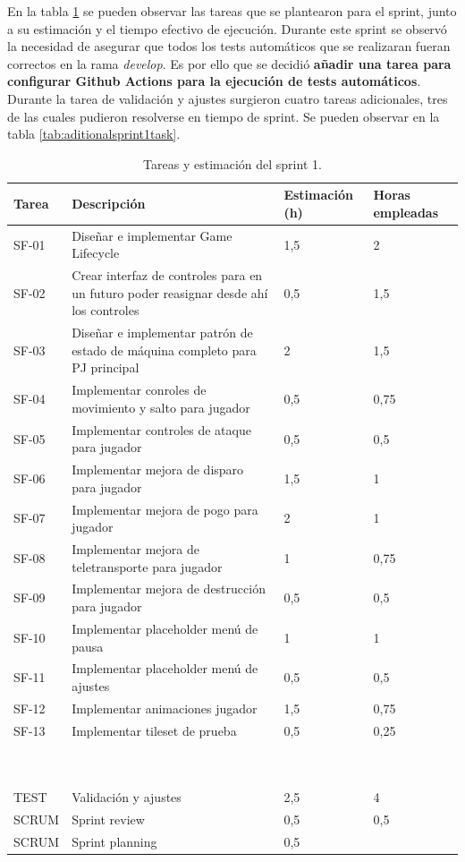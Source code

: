 En la tabla \ref{tab:sprint1task} se pueden observar las tareas que se plantearon para el sprint, junto a su estimación y el tiempo efectivo de ejecución. Durante este sprint se observó la necesidad de asegurar que todos los tests automáticos que se realizaran fueran correctos en la rama \textit{develop}. Es por ello que se decidió \textbf{añadir una tarea para configurar Github Actions para la ejecución de tests automáticos}. Durante la tarea de validación y ajustes surgieron cuatro tareas adicionales, tres de las cuales pudieron resolverse en tiempo de sprint. Se pueden observar en la tabla \ref{tab:aditionalsprint1task}.

\begin{table}[!ht]
    \centering
    \begin{tabular}{|l|p{8cm}|p{2cm}|p{2cm}|}
    \hline
        Tarea & Descripción & Estimación (h) & Horas empleadas \\ \hline
        SF-01 & Diseñar e implementar Game Lifecycle & 1,5 & 2 \\ \hline
        SF-02 & Crear interfaz de controles para en un futuro poder reasignar desde ahí los controles & 0,5 & 1,5 \\ \hline
        SF-03 & Diseñar e implementar patrón de estado de máquina completo para PJ principal & 2 & 1,5 \\ \hline
        SF-04 & Implementar conroles de movimiento y salto para jugador & 0,5 & 0,75 \\ \hline
        SF-05 & Implementar controles de ataque para jugador & 0,5 & 0,5 \\ \hline
        SF-06 & Implementar mejora de disparo para jugador & 1,5 & 1 \\ \hline
        SF-07 & Implementar mejora de pogo para jugador & 2 & 1 \\ \hline
        SF-08 & Implementar mejora de teletransporte para jugador & 1 & 0,75 \\ \hline
        SF-09 & Implementar mejora de destrucción para jugador & 0,5 & 0,5 \\ \hline
        SF-10 & Implementar placeholder menú de pausa & 1 & 1 \\ \hline
        SF-11 & Implementar placeholder menú de ajustes & 0,5 & 0,5 \\ \hline
        SF-12 & Implementar animaciones jugador & 1,5 & 0,75 \\ \hline
        SF-13 & Implementar tileset de prueba & 0,5 & 0,25 \\ \hline
        ~ & ~ & ~ & ~ \\ \hline
        ~ & ~ & ~ & ~ \\ \hline
        TEST & Validación y ajustes & 2,5 & 4 \\ \hline
        SCRUM & Sprint review & 0,5 & 0,5 \\ \hline
        SCRUM & Sprint planning & 0,5 & ~ \\ \hline
    \end{tabular}
    \caption{Tareas y estimación del sprint 1.}
    \label{tab:sprint1task}
\end{table}

